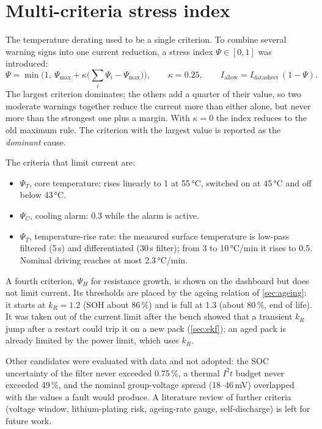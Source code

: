 
\section{Multi-criteria stress index}\label{sec:stress}
The temperature derating used to be a single criterion. To combine several warning signs into one current reduction, a stress index $\Psi \in [0,1]$ was introduced:
\begin{equation}
  \Psi = \min\!\Big(1,\ \Psi_\mathrm{max} + \kappa \big(\textstyle\sum_i \Psi_i - \Psi_\mathrm{max}\big)\Big),\qquad \kappa = 0.25,
  \qquad I_\mathrm{allow} = I_\mathrm{datasheet}\,(1 - \Psi).
\end{equation}
The largest criterion dominates; the others add a quarter of their value, so two moderate warnings together reduce the current more than either alone, but never more than the strongest one plus a margin. With $\kappa = 0$ the index reduces to the old maximum rule. The criterion with the largest value is reported as the \emph{dominant} cause.

The criteria that limit current are:
\begin{itemize}
  \item $\Psi_T$, core temperature: rises linearly to 1 at 55\,°C, switched on at 45\,°C and off below 43\,°C.
  \item $\Psi_C$, cooling alarm: 0.3 while the alarm is active.
  \item $\Psi_{\dot T}$, temperature-rise rate: the measured surface temperature is low-pass filtered (5\,s) and differentiated (30\,s filter); from 3 to 10\,°C/min it rises to 0.5. Nominal driving reaches at most 2.3\,°C/min.
\end{itemize}
A fourth criterion, $\Psi_H$ for resistance growth, is shown on the dashboard but does not limit current. Its thresholds are placed by the ageing relation of \cref{sec:ageing}: it starts at $k_R = 1.2$ (SOH about 86\,\%) and is full at 1.3 (about 80\,\%, end of life). It was taken out of the current limit after the bench showed that a transient $k_R$ jump after a restart could trip it on a new pack (\cref{sec:ekf}); an aged pack is already limited by the power limit, which uses $k_R$.

Other candidates were evaluated with data and not adopted: the SOC uncertainty of the filter never exceeded 0.75\,\%, a thermal $I^2t$ budget never exceeded 49\,\%, and the nominal group-voltage spread (18--46\,mV) overlapped with the values a fault would produce. A literature review of further criteria (voltage window, lithium-plating risk, ageing-rate gauge, self-discharge) is left for future work.

